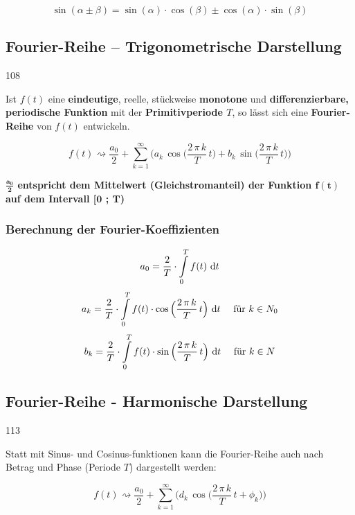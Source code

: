 \vspace{0.2cm}

$$ \sin(\alpha \pm \beta) = \sin(\alpha) \cdot \cos(\beta) \pm \cos(\alpha) \cdot \sin(\beta) $$
	

\subsection{Fourier-Reihe -- Trigonometrische Darstellung}{108}

Ist $f(t)$ eine \textbf{eindeutige}, reelle, stückweise \textbf{monotone} und \textbf{differenzierbare, periodische Funktion} mit der
\textbf{Primitivperiode $T$}, so lässt sich eine \textbf{Fourier-Reihe} von $f(t)$ entwickeln.

$$ \boxed{ f(t) \rightsquigarrow \frac{a_0}{2} + \sum\limits_{k=1}^\infty \Bigg( a_k\, \cos \Big(\frac{2 \, \pi \, k}{T} \, t \Big) + b_k\, \sin \Big(\frac{2 \, \pi \, k}{T} \, t \Big)  \Bigg) } $$

\textbf{$\bm{\frac{a_0}{2}}$ entspricht dem Mittelwert (Gleichstromanteil) der Funktion $\bm{f(t)}$ auf dem Intervall [$\bm{0}$ ; $\bm{T}$)} 


\subsubsection{Berechnung der Fourier-Koeffizienten}
\label{Berechnung der Fourier-Koeffizienten - Trigonometrisch}

$$ a_0 = \frac{2}{T} \cdot \int \limits_{0}^{T} f(t) \, \mathop{} \! \mathrm{d} t $$
$$ a_k = \frac{2}{T} \cdot \int \limits_{0}^{T} f(t) \cdot \cos \Big( \frac{2 \, \pi \, k}{T} \, t \Big) \, \mathop{} \! \mathrm{d} t \quad \text{ für } k \in N_0 $$
$$ b_k = \frac{2}{T} \cdot \int \limits_{0}^{T} f(t) \cdot \sin \Big( \frac{2 \, \pi \, k}{T} \, t \Big) \, \mathop{} \! \mathrm{d} t \quad \text{ für } k \in N $$

\textbf{}


\subsection{Fourier-Reihe - Harmonische Darstellung}{113}

Statt mit Sinus- und Cosinus-funktionen kann die Fourier-Reihe auch nach Betrag und Phase (Periode $T$) dargestellt werden:

$$  \boxed{ f(t) \rightsquigarrow \frac{a_0}{2} + \sum\limits_{k=1}^\infty \Big( d_k\, \cos \big(\frac{2 \, \pi \, k}{T} \, t + \phi_k \big) \Big) } $$

